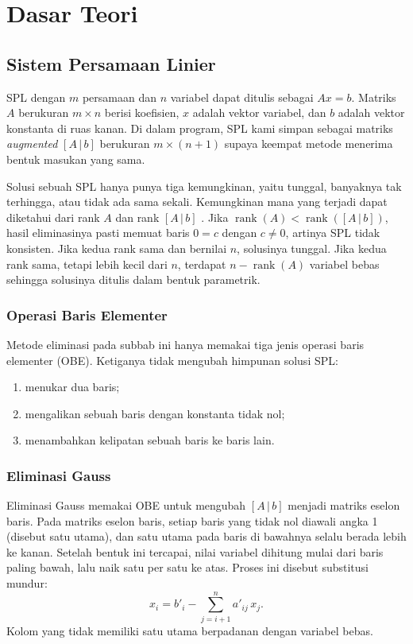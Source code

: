 \clearpage
\section{Dasar Teori}

\subsection{Sistem Persamaan Linier}

SPL dengan $m$ persamaan dan $n$ variabel dapat ditulis sebagai $Ax = b$. Matriks $A$ berukuran $m \times n$ berisi koefisien, $x$ adalah vektor variabel, dan $b$ adalah vektor konstanta di ruas kanan. Di dalam program, SPL kami simpan sebagai matriks \textit{augmented} $[A\,|\,b]$ berukuran $m \times (n+1)$ supaya keempat metode menerima bentuk masukan yang sama.

Solusi sebuah SPL hanya punya tiga kemungkinan, yaitu tunggal, banyaknya tak terhingga, atau tidak ada sama sekali. Kemungkinan mana yang terjadi dapat diketahui dari rank $A$ dan rank $[A\,|\,b]$ \cite{anton}. Jika $\operatorname{rank}(A) < \operatorname{rank}([A\,|\,b])$, hasil eliminasinya pasti memuat baris $0 = c$ dengan $c \neq 0$, artinya SPL tidak konsisten. Jika kedua rank sama dan bernilai $n$, solusinya tunggal. Jika kedua rank sama, tetapi lebih kecil dari $n$, terdapat $n - \operatorname{rank}(A)$ variabel bebas sehingga solusinya ditulis dalam bentuk parametrik.

\subsubsection{Operasi Baris Elementer}

Metode eliminasi pada subbab ini hanya memakai tiga jenis operasi baris elementer (OBE). Ketiganya tidak mengubah himpunan solusi SPL:
\begin{enumerate}[nosep]
  \item menukar dua baris;
  \item mengalikan sebuah baris dengan konstanta tidak nol;
  \item menambahkan kelipatan sebuah baris ke baris lain.
\end{enumerate}

\subsubsection{Eliminasi Gauss}

Eliminasi Gauss memakai OBE untuk mengubah $[A\,|\,b]$ menjadi matriks eselon baris. Pada matriks eselon baris, setiap baris yang tidak nol diawali angka 1 (disebut satu utama), dan satu utama pada baris di bawahnya selalu berada lebih ke kanan. Setelah bentuk ini tercapai, nilai variabel dihitung mulai dari baris paling bawah, lalu naik satu per satu ke atas. Proses ini disebut substitusi mundur:
\[
x_i = b'_i - \sum_{j=i+1}^{n} a'_{ij}\, x_j .
\]
Kolom yang tidak memiliki satu utama berpadanan dengan variabel bebas.

